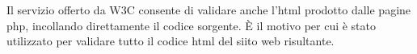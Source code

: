 Il servizio offerto da W3C consente di validare anche l'html prodotto dalle pagine php, incollando direttamente il codice sorgente. È il motivo per cui è stato utilizzato per validare tutto il codice html del siito web risultante.